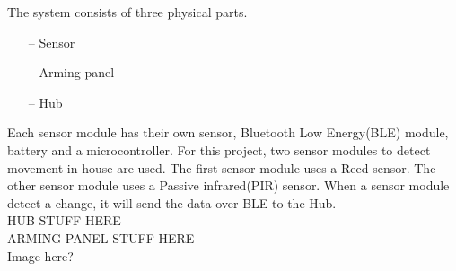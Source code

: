 The system consists of three physical parts.
\begin{itemize}
	\item[--]Sensor
	\item[--]Arming panel
	\item[--]Hub
\end{itemize} 

Each sensor module has their own sensor, Bluetooth Low Energy(BLE) module, battery and a microcontroller. For this project, two sensor modules to detect movement in house are used. The first sensor module uses a Reed sensor. The other sensor module uses a Passive infrared(PIR) sensor. 
When a sensor module detect a change, it will send the data over BLE to the Hub.\\
HUB STUFF HERE \\
ARMING PANEL STUFF HERE \\
Image here? 
